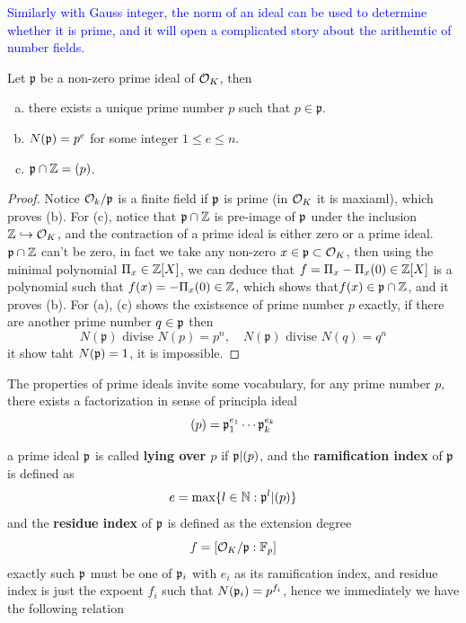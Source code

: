 \textcolor{blue}{Similarly with Gauss integer, the norm of an ideal can be used to determine whether it is prime, and it will open a complicated story about the arithemtic of number fields.}

\begin{lemma}
    Let \(\mathfrak{p}\) be a non-zero prime ideal of \(\mathcal{O}_K\), then
    \begin{enumerate} [(a)]
        \item there exists a unique prime number \(p\) such that \(p \in \mathfrak{p}\).
        \item \(N(\mathfrak{p}) = p^e\) for some integer \(1\leq e \leq n\).
        \item \(\mathfrak{p} \cap \mathbb{Z} = (p)\).

    \end{enumerate}
\end{lemma}

\begin{proof}
    Notice \(\mathcal{O}_k/\mathfrak{p}\) is a finite field if \(\mathfrak{p}\) is prime (in \(\mathcal{O}_K\) it is maxiaml), which proves (b). For (c), notice that \(\mathfrak{p} \cap \mathbb{Z}\) is pre-image of \(\mathfrak{p}\) under the inclusion \(\mathbb{Z} \hookrightarrow \mathcal{O}_K\), and the contraction of a prime ideal is either zero or a prime ideal. \(\mathfrak{p} \cap \mathbb{Z}\) can't be zero, in fact we take any non-zero \(x \in \mathfrak{p} \subset \mathcal{O}_K\), then using the minimal polynomial \(\Pi_x \in \mathbb{Z}[X]\), we can deduce that \(f = \Pi_x-\Pi_x(0) \in \mathbb{Z}[X]\) is a polynomial such that \(f(x) = -\Pi_x(0) \in \mathbb{Z}\), which shows that\(f(x) \in \mathfrak{p} \cap \mathbb{Z}\), and it proves (b). For (a), (c) shows the existsence of prime number \(p\) exactly, if there are another prime number \(q \in \mathfrak{p}\) then
    \[N(\mathfrak{p}) \text{ divise } N(p)=p^n, \quad N(\mathfrak{p}) \text{ divise } N(q)=q^n \]
    it show taht \(N(\mathfrak{p}) = 1\), it is impossible.
\end{proof}

The properties of prime ideals invite some vocabulary, for any prime number \(p\), there exists a factorization in sense of principla ideal
\[(p) = \mathfrak{p}_1^{e_1} \cdots \mathfrak{p}_k^{e_k}\]

a prime ideal \(\mathfrak{p}\) is called \textbf{lying over \(p\)} if \(\mathfrak{p} | (p)\), and the \textbf{ramification index} of \(\mathfrak{p}\) is defined as 
    \[e  = \max \{l \in \mathbb{N} : \mathfrak{p}^l | (p) \}\]
and the \textbf{residue index} of \(\mathfrak{p}\) is defined as the extension degree
\[f = [\mathcal{O}_K/\mathfrak{p} : \mathbb{F}_p]\]
    exactly such \(\mathfrak{p}\) must be one of \(\mathfrak{p}_i\) with \(e_i\) as its ramification index, and residue index is just the expoent \(f_i\) such that \(N(\mathfrak{p}_i) = p^{f_i}\), hence we immediately we have the following relation

